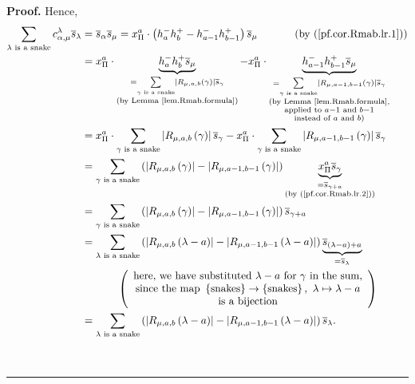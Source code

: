 \documentclass[numbers=enddot,12pt,final,onecolumn,notitlepage]{scrartcl}%
\theoremstyle{definition}
\newenvironment{proof}[1][Proof]{\noindent\textbf{#1.} }{\ \rule{0.5em}{0.5em}}
\let\sumnonlimits\sum
\renewcommand{\sum}{\sumnonlimits\limits}
\newenvironment{vershort}{}{}
\begin{document}
\begin{proof}
\begin{vershort}
\noindent Hence,%
\begin{align*}
\sum_{\lambda\text{ is a snake}}c_{\alpha,\mu}^{\lambda}\overline{s}%
_{\lambda}  &  =\overline{s}_{\alpha}\overline{s}_{\mu}=x_{\Pi}^{a}%
\cdot\left(  h_{a}^{-}h_{b}^{+}-h_{a-1}^{-}h_{b-1}^{+}\right)  \overline
{s}_{\mu}\ \ \ \ \ \ \ \ \ \ \left(  \text{by (\ref{pf.cor.Rmab.lr.1})}\right)
\\
&  =x_{\Pi}^{a}\cdot\underbrace{h_{a}^{-}h_{b}^{+}\overline{s}_{\mu}%
}_{\substack{=\sum_{\gamma\text{ is a snake}}\left\vert R_{\mu,a,b}\left(
\gamma\right)  \right\vert \overline{s}_{\gamma}\\\text{(by Lemma
\ref{lem.Rmab.formula})}}}-x_{\Pi}^{a}\cdot\underbrace{h_{a-1}^{-}h_{b-1}%
^{+}\overline{s}_{\mu}}_{\substack{=\sum_{\gamma\text{ is a snake}}\left\vert
R_{\mu,a-1,b-1}\left(  \gamma\right)  \right\vert \overline{s}_{\gamma
}\\\text{(by Lemma \ref{lem.Rmab.formula},}\\\text{applied to }a-1\text{ and
}b-1\\\text{instead of }a\text{ and }b\text{)}}}\\
&  =x_{\Pi}^{a}\cdot\sum_{\gamma\text{ is a snake}}\left\vert R_{\mu
,a,b}\left(  \gamma\right)  \right\vert \overline{s}_{\gamma}-x_{\Pi}^{a}%
\cdot\sum_{\gamma\text{ is a snake}}\left\vert R_{\mu,a-1,b-1}\left(
\gamma\right)  \right\vert \overline{s}_{\gamma}\\
&  =\sum_{\gamma\text{ is a snake}}\left(  \left\vert R_{\mu,a,b}\left(
\gamma\right)  \right\vert -\left\vert R_{\mu,a-1,b-1}\left(  \gamma\right)
\right\vert \right)  \underbrace{x_{\Pi}^{a}\overline{s}_{\gamma}%
}_{\substack{=\overline{s}_{\gamma+a}\\\text{(by (\ref{pf.cor.Rmab.lr.2}))}%
}}\\
&  =\sum_{\gamma\text{ is a snake}}\left(  \left\vert R_{\mu,a,b}\left(
\gamma\right)  \right\vert -\left\vert R_{\mu,a-1,b-1}\left(  \gamma\right)
\right\vert \right)  \overline{s}_{\gamma+a}\\
&  =\sum_{\lambda\text{ is a snake}}\left(  \left\vert R_{\mu,a,b}\left(
\lambda-a\right)  \right\vert -\left\vert R_{\mu,a-1,b-1}\left(
\lambda-a\right)  \right\vert \right)  \underbrace{\overline{s}_{\left(
\lambda-a\right)  +a}}_{=\overline{s}_{\lambda}}\\
&  \ \ \ \ \ \ \ \ \ \ \left(
\begin{array}
[c]{c}%
\text{here, we have substituted }\lambda-a\text{ for }\gamma\text{ in the
sum,}\\
\text{since the map }\left\{  \text{snakes}\right\}  \rightarrow\left\{
\text{snakes}\right\}  ,\ \lambda\mapsto\lambda-a\\
\text{is a bijection}%
\end{array}
\right) \\
&  =\sum_{\lambda\text{ is a snake}}\left(  \left\vert R_{\mu,a,b}\left(
\lambda-a\right)  \right\vert -\left\vert R_{\mu,a-1,b-1}\left(
\lambda-a\right)  \right\vert \right)  \overline{s}_{\lambda}.
\end{align*}


\end{vershort}
\end{proof}
\end{document}
